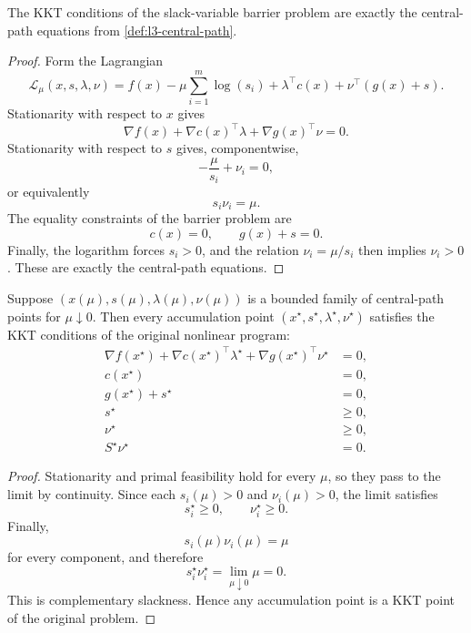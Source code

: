 \begin{proposition}\label{prop:l3-perturbed-kkt-system-for-the-barrier-problem}
	The KKT conditions of the slack-variable barrier problem are exactly the central-path equations from \autoref{def:l3-central-path}.
\end{proposition}
\begin{proof}
	Form the Lagrangian
	\[
		\mathcal{L}_{\mu}(x,s,\lambda,\nu)
		=
		f(x)-\mu\sum_{i=1}^{m}\log(s_i)
		+\lambda^\top c(x)
		+\nu^\top(g(x)+s).
	\]
	Stationarity with respect to $x$ gives
	\[
		\nabla f(x)+\nabla c(x)^\top \lambda+\nabla g(x)^\top \nu=0.
	\]
	Stationarity with respect to $s$ gives, componentwise,
	\[
		-\frac{\mu}{s_i}+\nu_i=0,
	\]
	or equivalently
	\[
		s_i\nu_i=\mu.
	\]
	The equality constraints of the barrier problem are
	\[
		c(x)=0,
		\qquad
		g(x)+s=0.
	\]
	Finally, the logarithm forces $s_i>0$, and the relation $\nu_i=\mu/s_i$ then implies $\nu_i>0$. These are exactly the central-path equations.
\end{proof}

\begin{theorem}\label{thm:l3-barrier-path-converges-to-kkt}
	Suppose $(x(\mu),s(\mu),\lambda(\mu),\nu(\mu))$ is a bounded family of central-path points for $\mu \downarrow 0$. Then every accumulation point $(x^\star,s^\star,\lambda^\star,\nu^\star)$ satisfies the KKT conditions of the original nonlinear program:
	\begin{align*}
		\nabla f(x^\star)+\nabla c(x^\star)^\top \lambda^\star+\nabla g(x^\star)^\top \nu^\star & = 0, \\
		c(x^\star) & = 0, \\
		g(x^\star)+s^\star & = 0, \\
		s^\star & \ge 0, \\
		\nu^\star & \ge 0, \\
		S^\star \nu^\star & = 0.
	\end{align*}
\end{theorem}
\begin{proof}
	Stationarity and primal feasibility hold for every $\mu$, so they pass to the limit by continuity. Since each $s_i(\mu)>0$ and $\nu_i(\mu)>0$, the limit satisfies
	\[
		s_i^\star \ge 0,
		\qquad
		\nu_i^\star \ge 0.
	\]
	Finally,
	\[
		s_i(\mu)\nu_i(\mu)=\mu
	\]
	for every component, and therefore
	\[
		s_i^\star \nu_i^\star = \lim_{\mu \downarrow 0} \mu = 0.
	\]
	This is complementary slackness. Hence any accumulation point is a KKT point of the original problem.
\end{proof}

